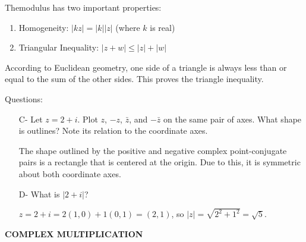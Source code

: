 \documentclass{book}
\begin{document}
\vspace{10pt}

Themodulus has two important properties:

\begin{enumerate}[label=(\alph*)]
\item Homogeneity: $|kz|=|k||z|$ (where $k$ is real)
\item Triangular Inequality: $|z+w|\leq|z|+|w|$
\end{enumerate}

\vspace{10pt}

According to Euclidean geometry, one side of a triangle is always less than or equal to the sum of the other sides. This proves the triangle inequality.

\newpage

Questions:

\begin{enumerate}
\item[C-] Let $z=2+i$. Plot $z$, $-z$, $\bar{z}$, and $-\bar{z}$ on the same pair of axes. What shape is outlines? Note its relation to the coordinate axes.
\begin{center}
\end{center}

The shape outlined by the positive and negative complex point-conjugate pairs is a rectangle that is centered at the origin. Due to this, it is symmetric about both coordinate axes.
\item[D-] What is $|2+i|$?

$z=2+i=2(1,0)+1(0,1)=(2,1)$, so $|z|=\sqrt{2^2+1^2}=\sqrt{5}$.
\end{enumerate}

\vspace{10pt}

{\bf{}\Large COMPLEX MULTIPLICATION}
\end{document}
